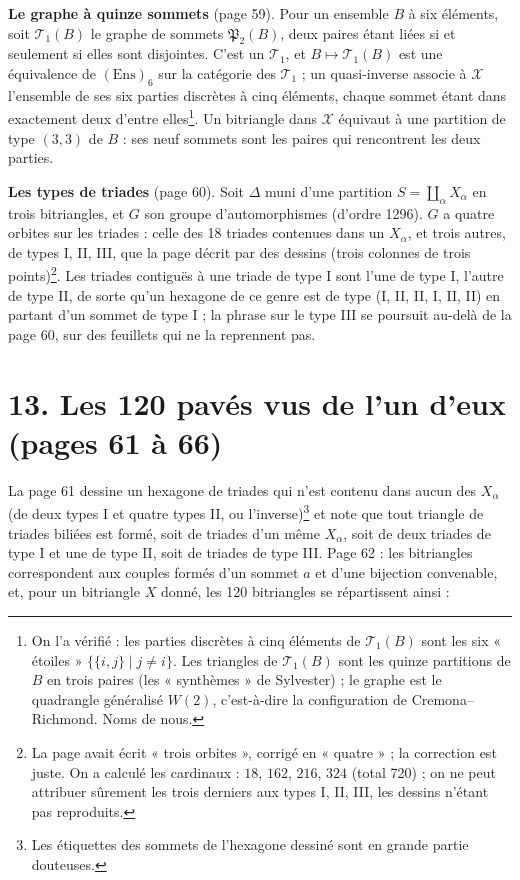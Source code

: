 \documentclass[11pt,a4paper]{article}
\begin{document}
\textbf{Le graphe à quinze sommets} (page 59). Pour un ensemble $B$ à six
éléments, soit $\mathcal{T}_1(B)$ le graphe de sommets $\mathfrak{P}_2(B)$, deux
paires étant liées si et seulement si elles sont disjointes. C'est un
$\mathcal{T}_1$, et $B \mapsto \mathcal{T}_1(B)$ est une équivalence de
$(\mathrm{Ens})_6$ sur la catégorie des $\mathcal{T}_1$ ; un quasi-inverse
associe à $\mathcal{X}$ l'ensemble de ses six parties discrètes à cinq
éléments, chaque sommet étant dans exactement deux d'entre elles\footnote{On l'a
vérifié : les parties discrètes à cinq éléments de $\mathcal{T}_1(B)$ sont les
six « étoiles » $\lbrace \lbrace i, j\rbrace \mid j \neq i\rbrace$. Les triangles de
$\mathcal{T}_1(B)$ sont les quinze partitions de $B$ en trois paires (les
« synthèmes » de Sylvester) ; le graphe est le quadrangle généralisé $W(2)$,
c'est-à-dire la configuration de Cremona--Richmond. Noms de nous.}. Un
bitriangle dans $\mathcal{X}$ équivaut à une partition de type $(3, 3)$ de $B$ :
ses neuf sommets sont les paires qui rencontrent les deux parties.

\textbf{Les types de triades} (page 60). Soit $\Delta$ muni d'une partition
$S = \coprod_\alpha X_\alpha$ en trois bitriangles, et $G$ son groupe
d'automorphismes (d'ordre 1296). $G$ a quatre orbites sur les triades : celle
des 18 triades contenues dans un $X_\alpha$, et trois autres, de types I, II,
III, que la page décrit par des dessins (trois colonnes de trois points)\footnote{La
page avait écrit « trois orbites », corrigé en « quatre » ; la correction est
juste. On a calculé les cardinaux : $18$, $162$, $216$, $324$ (total 720) ; on ne
peut attribuer sûrement les trois derniers aux types I, II, III, les dessins
n'étant pas reproduits.}. Les triades contiguës à une triade de type I sont l'une
de type I, l'autre de type II, de sorte qu'un hexagone de ce genre est de type
(I, II, II, I, II, II) en partant d'un sommet de type I ; la phrase sur le type
III se poursuit au-delà de la page 60, sur des feuillets qui ne la reprennent
pas.

\section*{13. Les 120 pavés vus de l'un d'eux (pages 61 à 66)}

La page 61 dessine un hexagone de triades qui n'est contenu dans aucun des
$X_\alpha$ (de deux types I et quatre types II, ou l'inverse)\footnote{Les
étiquettes des sommets de l'hexagone dessiné sont en grande partie douteuses.}
et note que tout triangle de triades biliées est formé, soit de triades d'un
même $X_\alpha$, soit de deux triades de type I et une de type II, soit de
triades de type III. Page 62 : les bitriangles correspondent aux couples formés
d'un sommet $a$ et d'une bijection convenable, et, pour un bitriangle $X$
donné, les 120 bitriangles se répartissent ainsi :
\end{document}
